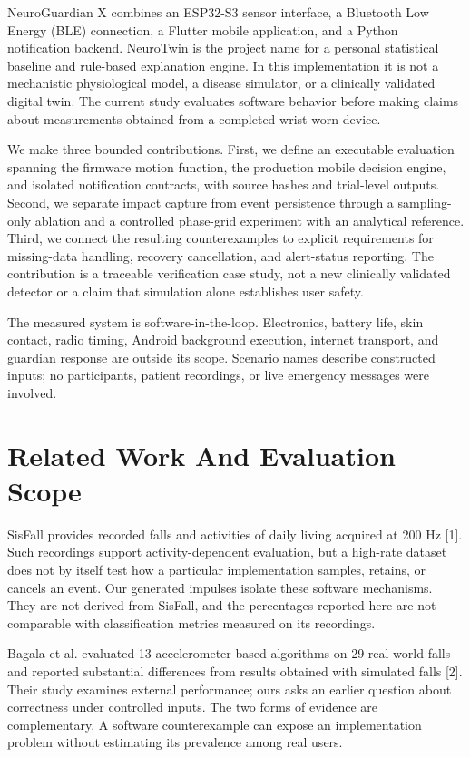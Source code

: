 \documentclass[journal]{IEEEtran}
\begin{document}
NeuroGuardian X combines an ESP32-S3 sensor interface, a Bluetooth Low Energy (BLE) connection, a Flutter mobile application, and a Python notification backend. NeuroTwin is the project name for a personal statistical baseline and rule-based explanation engine. In this implementation it is not a mechanistic physiological model, a disease simulator, or a clinically validated digital twin. The current study evaluates software behavior before making claims about measurements obtained from a completed wrist-worn device.

We make three bounded contributions. First, we define an executable evaluation spanning the firmware motion function, the production mobile decision engine, and isolated notification contracts, with source hashes and trial-level outputs. Second, we separate impact capture from event persistence through a sampling-only ablation and a controlled phase-grid experiment with an analytical reference. Third, we connect the resulting counterexamples to explicit requirements for missing-data handling, recovery cancellation, and alert-status reporting. The contribution is a traceable verification case study, not a new clinically validated detector or a claim that simulation alone establishes user safety.

The measured system is software-in-the-loop. Electronics, battery life, skin contact, radio timing, Android background execution, internet transport, and guardian response are outside its scope. Scenario names describe constructed inputs; no participants, patient recordings, or live emergency messages were involved.

\section{Related Work And Evaluation Scope}
SisFall provides recorded falls and activities of daily living acquired at 200 Hz [1]. Such recordings support activity-dependent evaluation, but a high-rate dataset does not by itself test how a particular implementation samples, retains, or cancels an event. Our generated impulses isolate these software mechanisms. They are not derived from SisFall, and the percentages reported here are not comparable with classification metrics measured on its recordings.

Bagala et al. evaluated 13 accelerometer-based algorithms on 29 real-world falls and reported substantial differences from results obtained with simulated falls [2]. Their study examines external performance; ours asks an earlier question about correctness under controlled inputs. The two forms of evidence are complementary. A software counterexample can expose an implementation problem without estimating its prevalence among real users.
\end{document}

